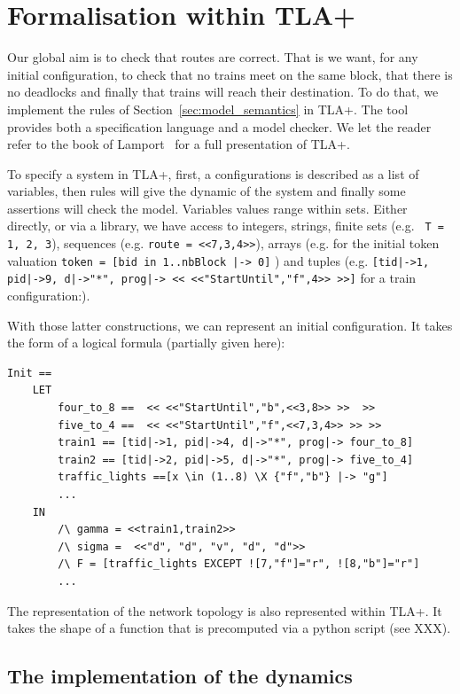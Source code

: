 \documentclass[runningheads]{llncs}
\begin{document}
\section{Formalisation within TLA+}
\label{sec:tla-formalisation}

Our global aim is to check that routes are correct. That is we want, for any initial configuration, to check that no trains meet on the same block, that there is no deadlocks and finally  that trains will reach their destination. To do that, we implement the rules of Section~\ref{sec:model_semantics} in TLA+. The tool provides both a specification language and a model checker. We let the reader refer to the book of Lamport~\cite{Lamport} for a full presentation of TLA+. 

To specify a system in TLA+, first, a configurations is described as a list of variables, then rules  will give the dynamic of the system and finally some assertions  will check the model.  Variables values range within sets. Either directly, or via a library, we have access to integers, strings, finite sets (e.g. \texttt{ T = {1, 2, 3}}), sequences (e.g. \texttt{route = <<7,3,4>>}),  arrays (e.g. for the initial token valuation \texttt{token = [bid in 1..nbBlock |-> 0]} ) and tuples (e.g. \texttt{[tid|->1, pid|->9, d|->"*", prog|-> << <<"StartUntil","f",4>> >>]}  for a train configuration:).

With those latter constructions, we can represent an initial configuration. It takes the form of a logical formula (partially given here):
\begin{verbatim}
Init == 
    LET 
        four_to_8 ==  << <<"StartUntil","b",<<3,8>> >>  >>
        five_to_4 ==  << <<"StartUntil","f",<<7,3,4>> >> >>
        train1 == [tid|->1, pid|->4, d|->"*", prog|-> four_to_8]
        train2 == [tid|->2, pid|->5, d|->"*", prog|-> five_to_4]
        traffic_lights ==[x \in (1..8) \X {"f","b"} |-> "g"]
        ...
    IN
        /\ gamma = <<train1,train2>>
        /\ sigma =  <<"d", "d", "v", "d", "d">> 
        /\ F = [traffic_lights EXCEPT ![7,"f"]="r", ![8,"b"]="r"]
        ...
\end{verbatim}

The representation of the network topology is also represented within TLA+. It takes the shape of a function that is precomputed via a python script (see XXX). 

\subsection{The implementation of the dynamics}
\end{document}
